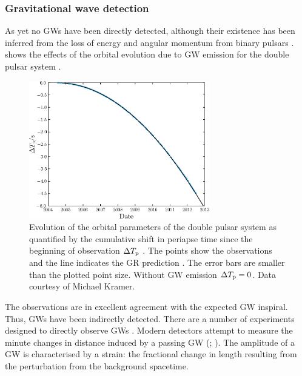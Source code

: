 \subsubsection{Gravitational wave detection}\label{sec:GW-det}

As yet no GWs have been directly detected, although their existence has been inferred from the loss of energy and angular momentum from binary pulsars \citep{Stairs2003}. 
 shows the effects of the orbital evolution due to GW emission for the double pulsar system \citep{Kramer2008}. 
\begin{figure}
  \centering
  \includegraphics[width=0.7\textwidth]{./images/Fig_Pulsar}
    \caption{Evolution of the orbital parameters of the double pulsar system as quantified by the cumulative shift in periapse time since the beginning of observation $\Delta T_\mathrm{p}$ \citep[cf.][]{Weisberg2010}. The points show the observations and the line indicates the GR prediction \citep{Kramer2008}. The error bars are smaller than the plotted point size. Without GW emission $\Delta T_\mathrm{p} = 0$. Data courtesy of Michael Kramer.}   
    \label{fig:pulsar} 
\end{figure} 
The observations are in excellent agreement with the expected GW inspiral. Thus, GWs have been indirectly detected.
There are a number of experiments designed to directly observe GWs \citep{Riles2012}. Modern detectors attempt to measure the minute changes in distance induced by a passing GW (\citealt[section 9.5]{Thorne1987}; \citealt[section 18.9]{Hobson2006}). The amplitude of a GW is characterised by a strain: the fractional change in length resulting from the perturbation from the background spacetime.

